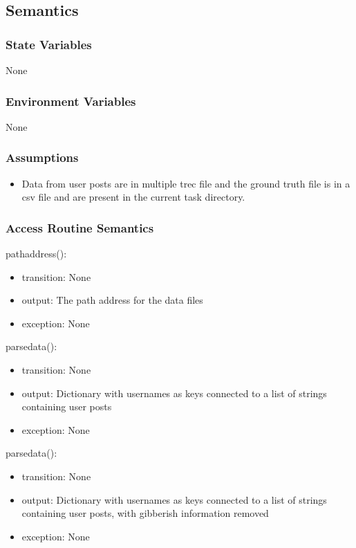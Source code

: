 \documentclass[12pt, titlepage]{article}
\begin{document}
\subsection{Semantics}

\subsubsection{State Variables}

None

\subsubsection{Environment Variables}

None

\subsubsection{Assumptions}

\begin{itemize}
\item Data from user posts are in multiple trec file and the ground truth file is in a csv file and are present in the current task directory.
\end{itemize}

\subsubsection{Access Routine Semantics}

\noindent pathaddress():
\begin{itemize}
\item transition: None
\item output: The path address for the data files
\item exception: None
\end{itemize}

\noindent parsedata():
\begin{itemize}
\item transition: None
\item output: Dictionary with usernames as keys connected to a list of strings containing user posts
\item exception: None
\end{itemize}

\noindent parsedata():
\begin{itemize}
\item transition: None
\item output: Dictionary with usernames as keys connected to a list of strings containing user posts, with gibberish information removed
\item exception: None
\end{itemize}
\end{document}
